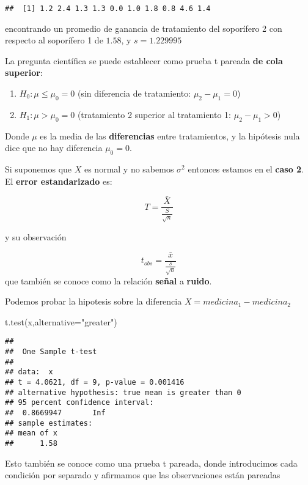 \documentclass[
]{book}
\newenvironment{Shaded}{\begin{snugshade}}{\end{snugshade}}
\newcommand{\AttributeTok}[1]{\textcolor[rgb]{0.77,0.63,0.00}{#1}}
\newcommand{\FunctionTok}[1]{\textcolor[rgb]{0.00,0.00,0.00}{#1}}
\newcommand{\NormalTok}[1]{#1}
\newcommand{\StringTok}[1]{\textcolor[rgb]{0.31,0.60,0.02}{#1}}
\providecommand{\tightlist}{%
  \setlength{\itemsep}{0pt}\setlength{\parskip}{0pt}}
\begin{document}
\begin{verbatim}
##  [1] 1.2 2.4 1.3 1.3 0.0 1.0 1.8 0.8 4.6 1.4
\end{verbatim}

encontrando un promedio de ganancia de tratamiento del soporífero 2 con respecto al soporífero 1 de \(1.58\), y \(s=1.229995\)

La pregunta científica se puede establecer como prueba t pareada \textbf{de cola superior}:

\begin{enumerate}
\def\labelenumi{\alph{enumi}.}
\tightlist
\item
  \(H_0:\mu \leq \mu_0=0\) (sin diferencia de tratamiento: \(\mu_2-\mu_1=0\))
\item
  \(H_1:\mu > \mu_0= 0\) (tratamiento 2 superior al tratamiento 1: \(\mu_2-\mu_1>0\))
\end{enumerate}

Donde \(\mu\) es la media de las \textbf{diferencias} entre tratamientos, y la hipótesis nula dice que no hay diferencia \(\mu_0=0\).

Si suponemos que \(X\) es normal y no sabemos \(\sigma^2\) entonces estamos en el \textbf{caso 2}. El \textbf{error estandarizado} es:

\[T=\frac{\bar{X}}{\frac{S}{\sqrt{n}}}\]

y su observación

\[t_{obs}=\frac{\bar{x}}{\frac{s}{\sqrt{n}}}\]
que también se conoce como la relación \textbf{señal} a \textbf{ruido}.

Podemos probar la hipotesis sobre la diferencia \(X=medicina_1-medicina_2\)

\begin{Shaded}
\begin{Highlighting}[]
\FunctionTok{t.test}\NormalTok{(x,}\AttributeTok{alternative=}\StringTok{"greater"}\NormalTok{)}
\end{Highlighting}
\end{Shaded}

\begin{verbatim}
## 
##  One Sample t-test
## 
## data:  x
## t = 4.0621, df = 9, p-value = 0.001416
## alternative hypothesis: true mean is greater than 0
## 95 percent confidence interval:
##  0.8669947       Inf
## sample estimates:
## mean of x 
##      1.58
\end{verbatim}

Esto también se conoce como una prueba t pareada, donde introducimos cada condición por separado y afirmamos que las observaciones están pareadas
\end{document}
